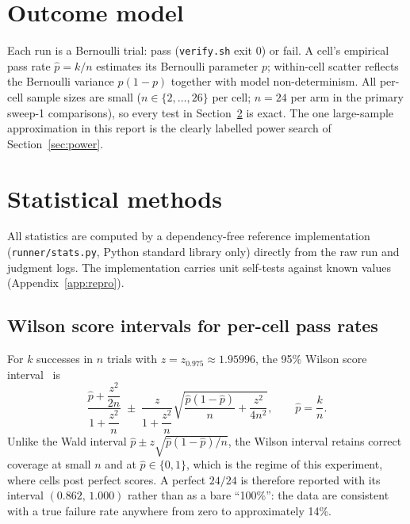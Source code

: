 \documentclass[11pt]{article}
\begin{document}
\section{Outcome model}

Each run is a Bernoulli trial: pass (\texttt{verify.sh} exit 0) or fail. A
cell's empirical pass rate $\hat p = k/n$ estimates its Bernoulli parameter
$p$; within-cell scatter reflects the Bernoulli variance $p(1-p)$ together
with model non-determinism. All per-cell sample sizes are small
($n \in \{2,\dots,26\}$ per cell; $n=24$ per arm in the primary sweep-1
comparisons), so every test in Section~\ref{sec:methods} is exact. The one
large-sample approximation in this report is the clearly labelled power
search of Section~\ref{sec:power}.

\section{Statistical methods}
\label{sec:methods}

All statistics are computed by a dependency-free reference implementation
(\texttt{runner/stats.py}, Python standard library only) directly from the
raw run and judgment logs. The implementation carries unit self-tests
against known values (Appendix~\ref{app:repro}).

\subsection{Wilson score intervals for per-cell pass rates}

For $k$ successes in $n$ trials with $z = z_{0.975} \approx 1.95996$, the
95\% Wilson score interval~\cite{wilson1927} is
%
\begin{equation}
\frac{\hat p + \dfrac{z^2}{2n}}{1 + \dfrac{z^2}{n}}
\;\pm\;
\frac{z}{1 + \dfrac{z^2}{n}}
\sqrt{\frac{\hat p (1-\hat p)}{n} + \frac{z^2}{4n^2}},
\qquad \hat p = \frac{k}{n}.
\label{eq:wilson}
\end{equation}
%
Unlike the Wald interval
$\hat p \pm z\sqrt{\hat p(1-\hat p)/n}$, the Wilson interval retains correct
coverage at small $n$ and at $\hat p \in \{0, 1\}$, which is the regime of
this experiment, where cells post perfect scores. A perfect $24/24$ is
therefore reported with its interval $(0.862,\,1.000)$ rather than as a bare
``100\%'': the data are consistent with a true failure rate anywhere from
zero to approximately 14\%.
\end{document}
